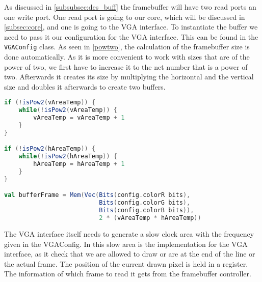 As discussed in \cref{subsubsec:des_buff} the framebuffer will have two read ports an one write port. One read port is going to our core, which will be discussed in \cref{subsec:core}, and one is going to the VGA interface. To instantiate the buffer we need to pass it our configuration for the VGA interface. This can be found in the \texttt{VGAConfig} class. As seen in \cref{powtwo}, the calculation of the framebuffer size is done automatically. As it is more convenient to work with sizes that are of the power of two, we first have to increase it to the net number that is a power of two. Afterwards it creates its size by multiplying the horizontal and the vertical size and doubles it afterwards to create two buffers. 
\begin{lstlisting}[language=scala, caption={Resolution Check}, label=powtwo]
if (!isPow2(vAreaTemp)) {
	while(!isPow2(vAreaTemp)) {
		vAreaTemp = vAreaTemp + 1
	}
}

if (!isPow2(hAreaTemp)) {
	while(!isPow2(hAreaTemp)) {
		hAreaTemp = hAreaTemp + 1
	}
}

val bufferFrame = Mem(Vec(Bits(config.colorR bits), 
			  			  Bits(config.colorG bits), 
			  			  Bits(config.colorB bits)), 
			  			  2 * (vAreaTemp * hAreaTemp))
\end{lstlisting}
The VGA interface itself needs to generate a slow clock area with the frequency given in the VGAConfig. In this slow area is the implementation for the VGA interface, as it check that we are allowed to draw or are at the end of the line or the actual frame. The position of the current drawn pixel is held in a register. The information of which frame to read it gets from the framebuffer controller.
